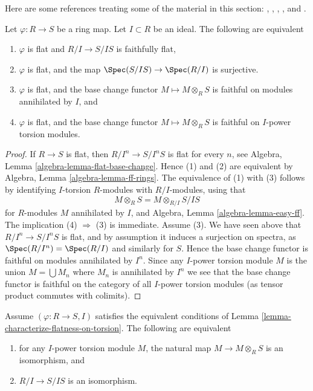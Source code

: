 \medskip\noindent
Here are some references treating some of the material in this section:
\cite[Section 2]{ArtinII},
\cite[Appendix]{Ferrand-Raynaud},
\cite{Beauville-Laszlo},
\cite{MB}, and
\cite[Section 4.6]{dJ-crystalline}.

\begin{lemma}
\label{lemma-characterize-flatness-on-torsion}
Let $\varphi : R \to S$ be a ring map. Let $I \subset R$ be an ideal.
The following are equivalent
\begin{enumerate}
\item $\varphi$ is flat and $R/I \to S/IS$ is faithfully flat,
\item $\varphi$ is flat, and the map
$\Spec(S/IS) \to \Spec(R/I)$ is surjective.
\item $\varphi$ is flat, and the base change functor
$M \mapsto M \otimes_R S$ is faithful on modules annihilated by $I$, and
\item $\varphi$ is flat, and the base change functor
$M \mapsto M \otimes_R S$ is faithful on $I$-power torsion modules.
\end{enumerate}
\end{lemma}

\begin{proof}
If $R \to S$ is flat, then $R/I^n \to S/I^nS$ is flat for every $n$, see
Algebra, Lemma \ref{algebra-lemma-flat-base-change}.
Hence (1) and (2) are equivalent by
Algebra, Lemma \ref{algebra-lemma-ff-rings}.
The equivalence of (1) with (3) follows by identifying $I$-torsion
$R$-modules with $R/I$-modules, using that
$$
M \otimes_R S = M \otimes_{R/I} S/IS
$$
for $R$-modules $M$ annihilated by $I$, and
Algebra, Lemma \ref{algebra-lemma-easy-ff}.
The implication (4) $\Rightarrow$ (3) is immediate. Assume (3). We have
seen above that $R/I^n \to S/I^nS$ is flat, and by assumption it induces
a surjection on spectra, as $\Spec(R/I^n) = \Spec(R/I)$ and
similarly for $S$. Hence the base change functor is faithful on modules
annihilated by $I^n$. Since any $I$-power torsion module $M$ is the union
$M = \bigcup M_n$ where $M_n$ is annihilated by $I^n$ we see that the base
change functor is faithful on the category of all $I$-power torsion modules
(as tensor product commutes with colimits).
\end{proof}

\begin{lemma}
\label{lemma-neighbourhood-isomorphism}
Assume $(\varphi : R \to S, I)$ satisfies the equivalent conditions of
Lemma \ref{lemma-characterize-flatness-on-torsion}.
The following are equivalent
\begin{enumerate}
\item for any $I$-power torsion module $M$, the natural map
$M \to M \otimes_R S$ is an isomorphism, and
\item $R/I \to S/IS$ is an isomorphism.
\end{enumerate}
\end{lemma}

